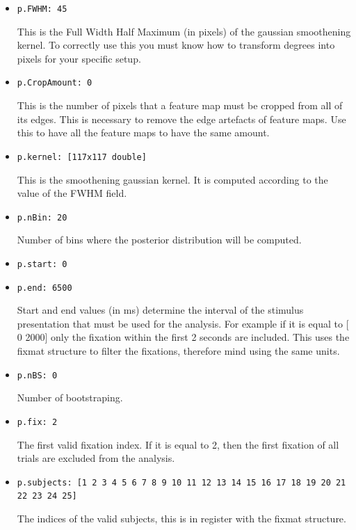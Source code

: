 \documentclass[a4paper,10pt]{report}
\begin{document}
\begin{itemize}
	\begin{itemize} 	 
		\item \texttt{p.FWHM: 45} 

		This is the Full Width Half Maximum (in pixels) of the gaussian smoothening kernel. To correctly use this you must know how to transform degrees into pixels for your specific setup.
    		\item \texttt{p.CropAmount: 0} 

		This is the number of pixels that a feature map must be cropped from all of its edges. This is necessary to remove the edge artefacts of feature maps. Use this to have all the feature maps to have the same amount.
        	
		\item \texttt{p.kernel: [117x117 double]} 

		This is the smoothening gaussian kernel. It is computed according to the value of the FWHM field.
        	
		\item \texttt{p.nBin: 20} 
		
		Number of bins where the posterior distribution will be computed.

        	\item \texttt{p.start: 0} 
           	
		\item \texttt{p.end: 6500} 

		Start and end values (in ms) determine the interval of the stimulus presentation that must be used for the analysis. For example if it is equal to [ 0 2000] only the fixation within the first 2 seconds are included. This uses the fixmat structure to filter the fixations, therefore mind using the same units.

           	\item \texttt{p.nBS: 0} 
		
		Number of bootstraping.

           	\item \texttt{p.fix: 2} 

		The first valid fixation index. If it is equal to 2, then the first fixation of all trials are excluded from the analysis.

      		\item \texttt{p.subjects: [1 2 3 4 5 6 7 8 9 10 11 12 13 14 15 16 17 18 19 20 21 22 23 24 25]} 

		The indices of the valid subjects, this is in register with the fixmat structure.
        	

\end{itemize}
\end{itemize}
\end{document}
